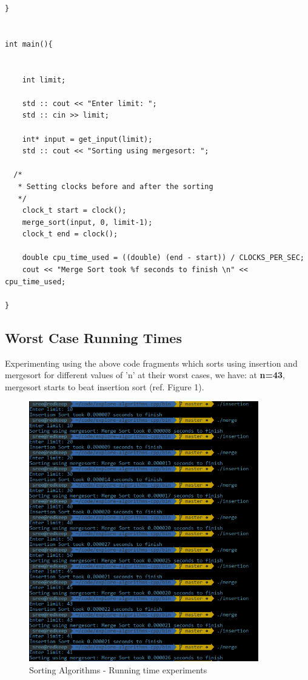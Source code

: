 \documentclass{article}
\begin{document}
\begin{verbatim}
}


int main(){


    int limit;
    
    std :: cout << "Enter limit: ";
    std :: cin >> limit;

    int* input = get_input(limit);
    std :: cout << "Sorting using mergesort: ";
    
  /*
   * Setting clocks before and after the sorting
   */    
    clock_t start = clock();
    merge_sort(input, 0, limit-1);
    clock_t end = clock();

    double cpu_time_used = ((double) (end - start)) / CLOCKS_PER_SEC;
    cout << "Merge Sort took %f seconds to finish \n" << cpu_time_used;

}

\end{verbatim}


\pagebreak

\subsection{Worst Case Running Times}

Experimenting using the above code fragments which sorts using insertion and mergesort for different values of 'n' at their worst cases, we have:
at \textbf{n=43}, mergesort starts to beat insertion sort (ref. Figure 1).

\begin{figure}
\includegraphics[width=10cm]{expt.png}
\caption{Sorting Algorithms - Running time experiments}  
\end{figure}
\end{document}
